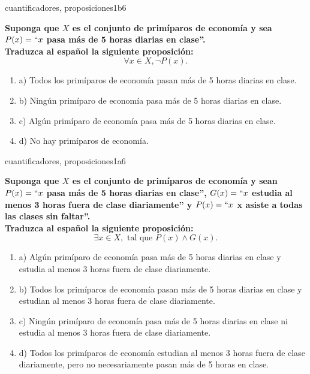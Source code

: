 \documentclass{article}
\begin{document}
\begin{question}{39}{cuantificadores, proposiciones}{1}{b}{6}{
\textbf{Suponga que $X$ es el conjunto de primíparos de economía y sea $P(x)=``x$ pasa más de 5 horas diarias en clase''.}\\

\textbf{Traduzca al español la siguiente proposición:}
\[
\forall x \in X, \neg P(x).
\]

\begin{enumerate}
\item a) Todos los primíparos de economía pasan más de 5 horas diarias en clase.
\item b) Ningún primíparo de economía pasa más de 5 horas diarias en clase.
\item c) Algún primíparo de economía pasa más de 5 horas diarias en clase.
\item d) No hay primíparos de economía.
\end{enumerate}
}
\end{question}

\begin{question}{40}{cuantificadores, proposiciones}{1}{a}{6}{
\textbf{Suponga que $X$ es el conjunto de primíparos de economía y sean $P(x)=``x$ pasa más de 5 horas diarias en clase'', $G(x)=``x$ estudia al menos 3 horas fuera de clase diariamente'' y $P(x)=``x$ x asiste a todas las clases sin faltar''.}\\

\textbf{Traduzca al español la siguiente proposición:}
\[
\exists x \in X, \text{ tal que } P(x) \land G(x).
\]

\begin{enumerate}
\item a) Algún primíparo de economía pasa más de 5 horas diarias en clase y estudia al menos 3 horas fuera de clase diariamente.
\item b) Todos los primíparos de economía pasan más de 5 horas diarias en clase y estudian al menos 3 horas fuera de clase diariamente.
\item c) Ningún primíparo de economía pasa más de 5 horas diarias en clase ni estudia al menos 3 horas fuera de clase diariamente.
\item d) Todos los primíparos de economía estudian al menos 3 horas fuera de clase diariamente, pero no necesariamente pasan más de 5 horas en clase.
\end{enumerate}
}
\end{question}
\end{document}
